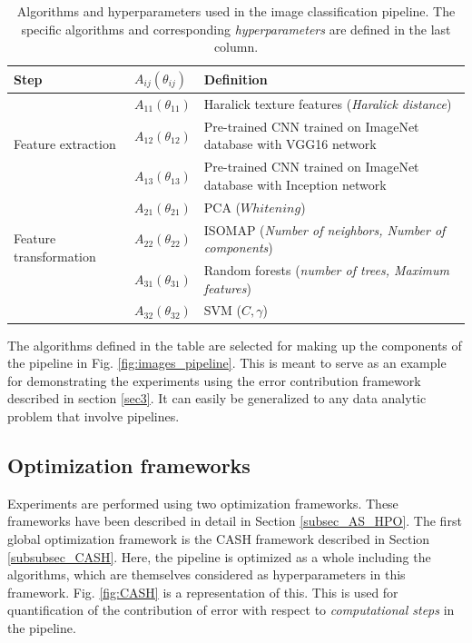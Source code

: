 \begin{table}[ht!]
\centering
\caption{Algorithms and hyperparameters used in the image classification pipeline. The specific algorithms and corresponding \textit{hyperparameters} are defined in the last column.}
\begin{tabular}{@{} |m{9.7em}|m{1.5cm}|m{8cm}| @{}} 
 \hline
 Step & $A_{ij}(\theta_{ij})$ & Definition \\ 
 \hline
 \multirow{3}{*}{Feature extraction} & $A_{11}(\theta_{11})$ & Haralick texture features (\textit{Haralick distance}) \\ 
 & $A_{12}(\theta_{12})$ & Pre-trained CNN trained on ImageNet \cite{deng2009imagenet} database with VGG16 \cite{simonyan2014very} network  \\
  & $A_{13}(\theta_{13})$ & Pre-trained CNN trained on ImageNet \cite{deng2009imagenet} database with Inception \cite{szegedy2016rethinking} network  \\
 \hline
 \multirow{3}{*}{Feature transformation} & $A_{21}(\theta_{21})$ & PCA ($Whitening$) \cite{wold1987principal} \\
 & $A_{22}(\theta_{22})$ & ISOMAP (\textit{Number of neighbors, Number of components}) \cite{tenenbaum2000global} \\
 \hline
 \multirow{3}{*}{Learning algorithms} & $A_{31}(\theta_{31})$ & Random forests (\textit{number of trees, Maximum features}) \cite{breiman2001random} \\
 & $A_{32}(\theta_{32})$ & SVM ($C, \gamma$) \cite{cortes1995support}\\
 \hline
 \end{tabular}
 \label{table:algorithms_table}
\end{table}
The algorithms defined in the table are selected for making up the components of the pipeline in Fig. \ref{fig:images_pipeline}. This is meant to serve as an example for demonstrating the experiments using the error contribution framework described in section \ref{sec3}. It can easily be generalized to any data analytic problem that involve pipelines. 

\subsection{Optimization frameworks}
\label{frameworks}
Experiments are performed using two optimization frameworks. These frameworks have been described in detail in Section \ref{subsec_AS_HPO}. 
The first global optimization framework is the CASH framework described in Section \ref{subsubsec_CASH}. Here, the pipeline is optimized as a whole including the algorithms, which are themselves considered as hyperparameters in this framework.  Fig. \ref{fig:CASH} is a representation of this. This is used for quantification of the contribution of error with respect to \textit{computational steps} in the pipeline.

